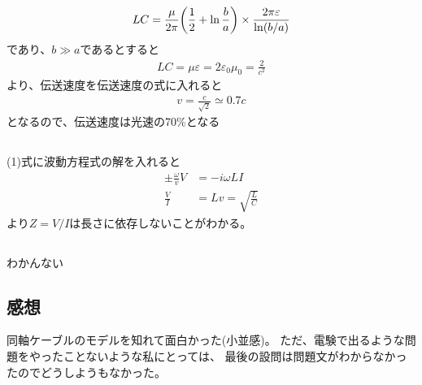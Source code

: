 \documentclass[../../master.tex]{subfiles}
\begin{document}
\subsection{}
\begin{align}
    LC = \frac{\mu}{2\pi}\qty(\frac{1}{2}+\ln\frac{b}{a}) \times \frac{2\pi\varepsilon}{\ln(b/a)}
\end{align}
であり、\(b\gg a\)であるとすると
\begin{align}
    LC = \mu\varepsilon = 2 \varepsilon_0 \mu_0 = \frac{2}{c^2}
\end{align}
より、伝送速度を伝送速度の式に入れると
\begin{align}
    v = \frac{c}{\sqrt{2}} \simeq 0.7 c
\end{align}
となるので、伝送速度は光速の70\%となる

\subsection{}
(1)式に波動方程式の解を入れると
\begin{align}
    \pm\frac{\omega}{v} V &= -i\omega LI\\
    \frac{V}{I}&= Lv = \sqrt{\frac{L}{C}}
\end{align}
より\(Z=V/I\)は長さに依存しないことがわかる。

\subsection{}
わかんない

\subsection*{感想}
同軸ケーブルのモデルを知れて面白かった(小並感)。
ただ、電験で出るような問題をやったことないような私にとっては、
最後の設問は問題文がわからなかったのでどうしようもなかった。
\end{document}
